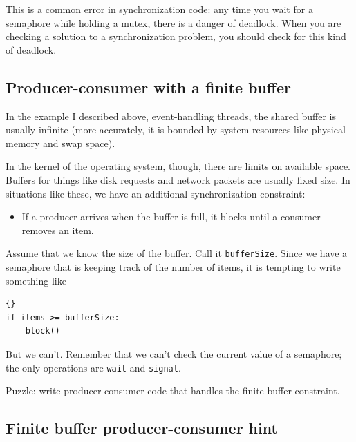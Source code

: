 \documentclass{book}
\newcommand{\clearemptydoublepage}{\newpage\cleardoublepage}
\begin{document}
This is a common error in synchronization code: any time
you wait for a semaphore while holding a mutex, there is
a danger of deadlock.  When you are checking a solution to
a synchronization problem, you should check for this kind
of deadlock.


\subsection{Producer-consumer with a finite buffer}

In the example I described above, event-handling threads,
the shared buffer is usually infinite (more accurately, it is
bounded by system resources like physical memory and swap
space).

In the kernel of the operating system, though, there are
limits on available space.  Buffers for things like disk
requests and network packets are usually fixed size.  In
situations like these, we have an additional synchronization
constraint:

\begin{itemize}

\item If a producer arrives when the buffer is full, it
blocks until a consumer removes an item.

\end{itemize}

Assume that we know the size of the buffer.  Call it
{\tt bufferSize}.  Since we have a semaphore that is keeping
track of the number of items, it is tempting to write something
like 

\begin{latin}
\begin{latin}
\begin{lstlisting}[title={Broken finite buffer solution}]{}
if items >= bufferSize:
    block()
\end{lstlisting}
\end{latin}
\end{latin}

But we can't.  Remember that we can't check the current
value of a semaphore; the only operations are {\tt wait}
and {\tt signal}.

Puzzle: write producer-consumer code that handles the finite-buffer
constraint.

\clearemptydoublepage
\subsection{Finite buffer producer-consumer hint}
\end{document}
